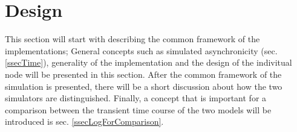 %
%
%






\section{Design} %
	\label{secDesignForANN}

	This section will start with describing the common framework of the implementations; 
		General concepts such as simulated asynchronicity (sec.\ref{ssecTime}), generality of the implementation and the design of the indivitual node will be presented in this section. %
	After the common framework of the simulation is presented, there will be a short discussion about how the two simulators are distinguished. %
	Finally, a concept that is important for a comparison between the transient time course of the two models will be introduced is sec. \ref{ssecLogForComparison}. %
	
	


